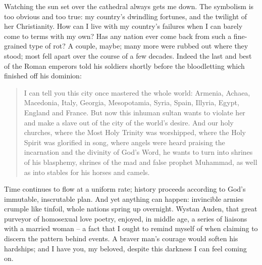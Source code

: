 Watching the sun set over the cathedral always gets me down. The symbolism is too obvious and too true: my country's dwindling fortunes, and the twilight of her Christianity. How can I live with my country's failures when I can barely come to terms with my own? Has any nation ever come back from such a fine-grained type of rot? A couple, maybe; many more were rubbed out where they stood; most fell apart over the course of a few decades. Indeed the last and best of the Roman emperors told his soldiers shortly before the bloodletting which finished off his dominion:

\begin{quote}
    I can tell you this city once mastered the whole world: Armenia, Achaea, Macedonia, Italy, Georgia, Mesopotamia, Syria, Spain, Illyria, Egypt, England and France. But now this inhuman sultan wants to violate her and make a slave out of the city of the world's desire. And our holy churches, where the Most Holy Trinity was worshipped, where the Holy Spirit was glorified in song, where angels were heard praising the incarnation and the divinity of God's Word, he wants to turn into shrines of his blasphemy, shrines of the mad and false prophet Muhammad, as well as into stables for his horses and camels.
\end{quote}

Time continues to flow at a uniform rate; history proceeds according to God's immutable, inscrutable plan. And yet anything can happen: invincible armies crumple like tinfoil, whole nations spring up overnight. Wystan Auden, that great purveyor of homosexual love poetry, enjoyed, in middle age, a series of liaisons with a married woman -- a fact that I ought to remind myself of when claiming to discern the pattern behind events. A braver man's courage would soften his hardships; and I have you, my beloved, despite this darkness I can feel coming on.
